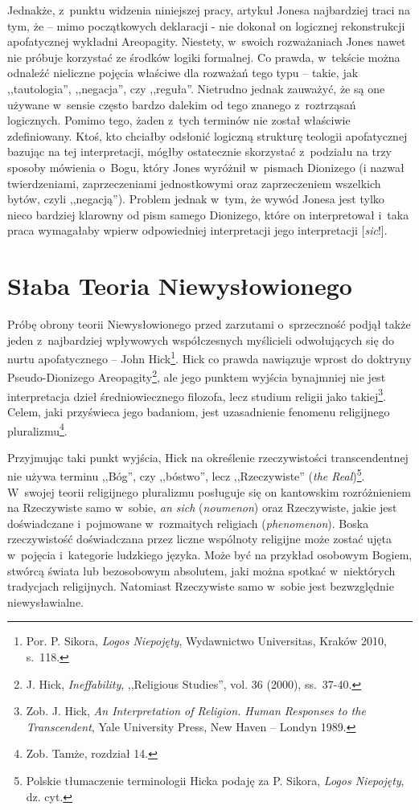 Jednakże, z~punktu widzenia niniejszej pracy, artykuł Jonesa najbardziej traci na tym, że -- mimo początkowych deklaracji - nie dokonał on logicznej rekonstrukcji apofatycznej wykładni Areopagity. Niestety, w~swoich rozważaniach Jones nawet nie próbuje korzystać ze środków logiki formalnej. Co prawda, w~tekście można odnaleźć nieliczne pojęcia właściwe dla rozważań tego typu -- takie, jak ,,tautologia'', ,,negacja'', czy ,,reguła''. Nietrudno jednak zauważyć, że są one używane w~sensie często bardzo dalekim od tego znanego z~roztrząsań logicznych. Pomimo tego, żaden z~tych terminów nie został właściwie zdefiniowany. Ktoś, kto chciałby odsłonić logiczną strukturę teologii apofatycznej bazując na tej interpretacji, mógłby ostatecznie skorzystać z~podziału na trzy sposoby mówienia o~Bogu, który Jones wyróżnił w~pismach Dionizego (i nazwał twierdzeniami, zaprzeczeniami jednostkowymi oraz zaprzeczeniem wszelkich bytów, czyli ,,negacją''). Problem jednak w~tym, że wywód Jonesa jest tylko nieco bardziej klarowny od pism samego Dionizego, które on interpretował i~taka praca wymagałaby wpierw odpowiedniej interpretacji jego interpretacji [\textit{sic}!].


\chapter{Słaba Teoria Niewysłowionego}\label{sil-slabatn}

Próbę obrony teorii Niewysłowionego przed zarzutami o~sprzeczność podjął także jeden z~najbardziej wpływowych współczesnych myślicieli odwołujących się do nurtu apofatycznego -- John Hick\footnote{Por. P. Sikora, \textit{Logos Niepojęty}, Wydawnictwo Universitas, Kraków 2010, s.~118.}. Hick co prawda nawiązuje wprost do doktryny Pseudo-Dionizego Areopagity\footnote{J. Hick, \textit{Ineffability}, ,,Religious Studies'', vol. 36 (2000), ss.~37-40.}, ale jego punktem wyjścia bynajmniej nie jest interpretacja dzieł średniowiecznego filozofa, lecz studium religii jako takiej\footnote{Zob. J. Hick, \textit{An Interpretation of Religion. Human Responses to the Transcendent}, Yale University Press, New Haven -- Londyn 1989.}. Celem, jaki przyświeca jego badaniom, jest uzasadnienie fenomenu religijnego pluralizmu\footnote{Zob. Tamże, rozdział 14.}.

Przyjmując taki punkt wyjścia, Hick na określenie rzeczywistości transcendentnej nie używa terminu ,,Bóg'', czy ,,bóstwo'', lecz ,,Rzeczywiste'' (\textit{the Real})\footnote{Polskie tłumaczenie terminologii Hicka podaję za P. Sikora, \textit{Logos Niepojęty}, dz. cyt.}. W~swojej teorii religijnego pluralizmu posługuje się on kantowskim rozróżnieniem na Rzeczywiste samo w~sobie, \textit{an sich} (\textit{noumenon}) oraz Rzeczywiste, jakie jest doświadczane i~pojmowane w~rozmaitych religiach (\textit{phenomenon}). Boska rzeczywistość doświadczana przez liczne wspólnoty religijne może zostać ujęta w~pojęcia i~kategorie ludzkiego języka. Może być na przykład osobowym Bogiem, stwórcą świata lub bezosobowym absolutem, jaki można spotkać w~niektórych tradycjach religijnych. Natomiast Rzeczywiste samo w~sobie jest bezwzględnie niewysławialne.

